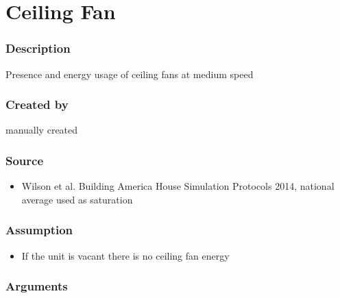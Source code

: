 \section{Ceiling Fan}\label{ceiling_fan}

\subsubsection{Description}\label{description-10}

Presence and energy usage of ceiling fans at medium speed

\subsubsection{Created by}\label{created-by-10}

manually created

\subsubsection{Source}\label{source-10}

\begin{itemize}
 
\item
  Wilson et al. \textquotesingle Building America House Simulation
  Protocols\textquotesingle{} 2014, national average used as saturation
\end{itemize}

\subsubsection{Assumption}\label{assumption-4}

\begin{itemize}
 
\item
  If the unit is vacant there is no ceiling fan energy
\end{itemize}

\subsubsection{Arguments}\label{arguments-4}

